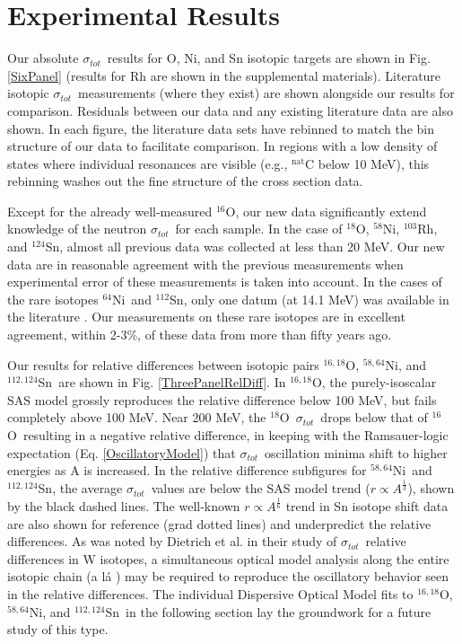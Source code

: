 \documentclass[twocolumn,secnumarabic,amssymb, nobibnotes, aps, prl,
superscriptaddress, nobalancelastpage]{revtex4}
\newcommand{\tot}{\ensuremath{\sigma_{tot}}}
\newcommand{\oSix}{\ensuremath{^{16}}O}
\newcommand{\oEight}{\ensuremath{^{18}}O}
\newcommand{\oSixEight}{\ensuremath{^{16,18}}O}
\newcommand{\niEight}{\ensuremath{^{58}}N\lowercase{i}}
\newcommand{\niFour}{\ensuremath{^{64}}N\lowercase{i}}
\newcommand{\niEightFour}{\ensuremath{^{58,64}}N\lowercase{i}}
\newcommand{\rhThree}{\ensuremath{^{103}}R\lowercase{h}}
\newcommand{\snTwelve}{\ensuremath{^{112}}S\lowercase{n}}
\newcommand{\snFour}{\ensuremath{^{124}}S\lowercase{n}}
\newcommand{\snTwelveFour}{\ensuremath{^{112,124}}S\lowercase{n}}
\begin{document}
\section{Experimental Results}

Our absolute \tot\ results for O, Ni, and Sn isotopic targets are shown in Fig.
\ref{SixPanel} (results for Rh are shown in the supplemental materials).
Literature isotopic \tot\ measurements
(where they exist) are shown alongside our results for comparison.
Residuals between our data and any existing literature data are also shown.
In each figure, the literature data sets have rebinned to match the bin
structure of our data to facilitate comparison. In regions with a low density of
states where individual resonances are visible (e.g., $^{\text{nat}}$C
below 10 MeV), this rebinning washes out the fine structure of the
cross section data.

Except for the already well-measured \oSix, our new data significantly
extend knowledge of the neutron \tot\ for each sample. In the case of \oEight,
\niEight, \rhThree, and \snFour, almost all previous data was collected at less 
than 20 MeV. Our new data are in reasonable agreement with the previous
measurements when experimental error of these measurements is taken into
account. In the cases of the rare isotopes \niFour\ and \snTwelve,
only one datum (at 14.1 MeV) was 
available in the literature \cite{Dukarevich1967}. Our measurements on these
rare isotopes are in excellent agreement, within 2-3\%, of these data from more
than fifty years ago.

Our results for relative differences between isotopic pairs \oSixEight,
\niEightFour, and \snTwelveFour\ are shown in Fig. \ref{ThreePanelRelDiff}. In
\oSixEight, the purely-isoscalar SAS model grossly reproduces the relative
difference below 100 MeV, but fails completely above 100 MeV. Near 200
MeV, the \oEight\ \tot\ drops below that of \oSix\ resulting in a negative
relative difference, in keeping with the Ramsauer-logic expectation (Eq.
\ref{OscillatoryModel}) that \tot\ oscillation minima shift to higher
energies as A is increased. In the relative difference subfigures for 
\niEightFour\ and \snTwelveFour, the average \tot\ values are below the
SAS model trend ($r \propto A^{\frac{1}{3}}$), shown by the black dashed lines. 
The well-known $r \propto A^{\frac{1}{6}}$ trend in Sn isotope shift data 
\cite{Anselment1986} are also shown for reference (grad dotted lines) and
underpredict the relative differences. As was noted by Dietrich et al. in
their study of \tot\ relative differences in W isotopes, a simultaneous optical
model analysis along the entire isotopic chain (a l\'a \cite{Mueller2010})
may be required to reproduce the oscillatory behavior seen in the relative differences.
The individual Dispersive Optical Model fits to \oSixEight, \niEightFour, and
\snTwelveFour\ in the following section lay the groundwork for a future study of
this type.
\end{document}
